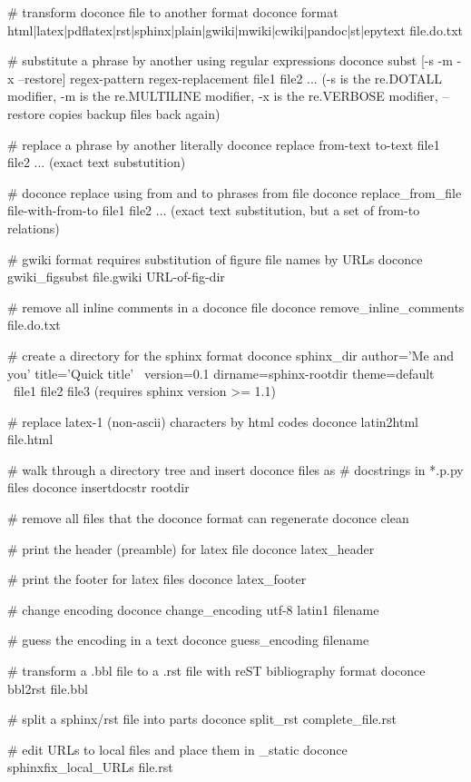 \documentclass[%
oneside,                 %
final,                   %
chapterprefix=true,      %
open=right               %
10pt]{book}
\begin{document}
{# transform doconce file to another format
doconce format html|latex|pdflatex|rst|sphinx|plain|gwiki|mwiki|cwiki|pandoc|st|epytext file.do.txt

# substitute a phrase by another using regular expressions
doconce subst [-s -m -x --restore] regex-pattern regex-replacement file1 file2 ...
(-s is the re.DOTALL modifier, -m is the re.MULTILINE modifier,
 -x is the re.VERBOSE modifier, --restore copies backup files back again)

# replace a phrase by another literally
doconce replace from-text to-text file1 file2 ...
(exact text substutition)

# doconce replace using from and to phrases from file
doconce replace_from_file file-with-from-to file1 file2 ...
(exact text substitution, but a set of from-to relations)

# gwiki format requires substitution of figure file names by URLs
doconce gwiki_figsubst file.gwiki URL-of-fig-dir

# remove all inline comments in a doconce file
doconce remove_inline_comments file.do.txt

# create a directory for the sphinx format
doconce sphinx_dir author='Me and you' title='Quick title' \
    version=0.1 dirname=sphinx-rootdir theme=default \
    file1 file2 file3
(requires sphinx version >= 1.1)

# replace latex-1 (non-ascii) characters by html codes
doconce latin2html file.html

# walk through a directory tree and insert doconce files as
# docstrings in *.p.py files
doconce insertdocstr rootdir

# remove all files that the doconce format can regenerate
doconce clean

# print the header (preamble) for latex file
doconce latex_header

# print the footer for latex files
doconce latex_footer

# change encoding
doconce change_encoding utf-8 latin1 filename

# guess the encoding in a text
doconce guess_encoding filename

# transform a .bbl file to a .rst file with reST bibliography format
doconce bbl2rst file.bbl

# split a sphinx/rst file into parts
doconce split_rst complete_file.rst

# edit URLs to local files and place them in _static
doconce sphinxfix_local_URLs file.rst

}
\end{document}
